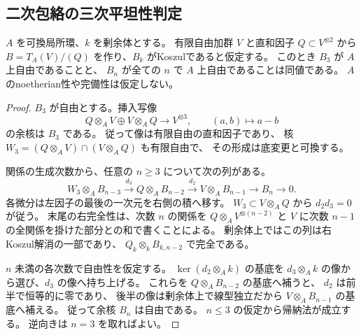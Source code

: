 \subsection{二次包絡の三次平坦性判定}
\begin{lemma}\label{lem:h3-degree-three-flat-koszul}
$A$ を可換局所環、$k$ を剰余体とする。
有限自由加群 $V$ と直和因子 $Q\subset V^{\otimes2}$ から
$B=T_A(V)/(Q)$ を作り、$B_k$ がKoszulであると仮定する。
このとき $B_3$ が $A$ 上自由であることと、
$B_n$ が全ての $n$ で $A$ 上自由であることは同値である。
$A$ のnoetherian性や完備性は仮定しない。
\end{lemma}
\begin{proof}
$B_3$ が自由とする。挿入写像
\[
 Q\otimes_A V\oplus V\otimes_A Q\longrightarrow V^{\otimes3},
 \qquad (a,b)\longmapsto a-b
\]
の余核は $B_3$ である。
従って像は有限自由の直和因子であり、
核 $W_3=(Q\otimes_A V)\cap(V\otimes_A Q)$ も有限自由で、
その形成は底変更と可換する。

関係の生成次数から、任意の $n\ge3$ について次の列がある。
\[
 W_3\otimes_A B_{n-3}
 \xrightarrow{d_3} Q\otimes_A B_{n-2}
 \xrightarrow{d_2} V\otimes_A B_{n-1}
 \longrightarrow B_n\longrightarrow0.
\]
各微分は左因子の最後の一次元を右側の積へ移す。
$W_3\subset V\otimes_A Q$ から $d_2d_3=0$ が従う。
末尾の右完全性は、次数 $n$ の関係を
$Q\otimes_A V^{\otimes(n-2)}$ と
$V$ に次数 $n-1$ の全関係を掛けた部分との和で書くことによる。
剰余体上ではこの列は右Koszul解消の一部であり、
$Q_k\otimes_k B_{k,n-2}$ で完全である。

$n$ 未満の各次数で自由性を仮定する。
$\ker(d_2\otimes_A k)$ の基底を
$d_3\otimes_A k$ の像から選び、$d_3$ の像へ持ち上げる。
これらを $Q\otimes_A B_{n-2}$ の基底へ補うと、
$d_2$ は前半で恒等的に零であり、
後半の像は剰余体上で線型独立だから
$V\otimes_A B_{n-1}$ の基底へ補える。
従って余核 $B_n$ は自由である。
$n\le3$ の仮定から帰納法が成立する。
逆向きは $n=3$ を取ればよい。
\end{proof}

